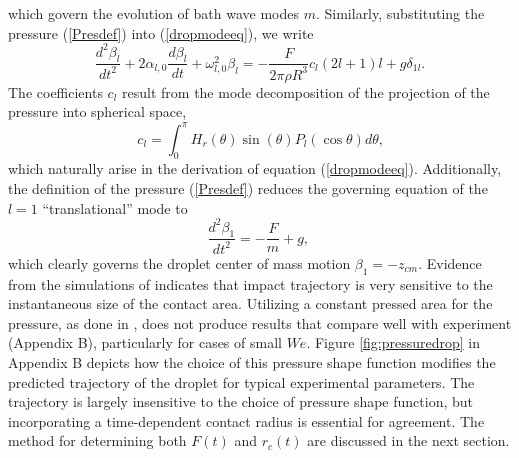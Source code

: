 \documentclass{jfm}
\begin{document}
which govern the evolution of bath wave modes $m$.
Similarly, substituting the pressure (\ref{Presdef}) into (\ref{dropmodeeq}), we write
\begin{equation}
    \frac{d^2 \beta_l}{dt^2} + 2 \alpha_{l,0} \frac{d \beta_l}{dt} + \omega_{l,0}^2 \beta_l = -\frac{F}{2 \pi \rho R^3} c_{l} (2l+1) l + g \delta_{1l} \text{.}
    \label{dropmodeeq2}
\end{equation}
The coefficients $c_{l}$ result from the mode decomposition of the projection of the pressure into spherical space,
\begin{equation}
    c_{l} = \int_0^{\pi} H_r(\theta) \sin(\theta) P_l(\cos{\theta}) d\theta  \text{,}
\end{equation}
which naturally arise in the derivation of equation (\ref{dropmodeeq}). 
Additionally, the definition of the pressure (\ref{Presdef}) reduces the governing equation of the $l=1$ ``translational'' mode to
\begin{equation}
    \frac{d^2 \beta_1}{dt^2} = -\frac{F}{m} + g \text{, } 
\end{equation}
which clearly governs the droplet center of mass motion $\beta_1=-z_{cm}$.
Evidence from the simulations of \cite{galeano2017non} indicates that impact trajectory is very sensitive to the instantaneous size of the contact area. Utilizing a constant pressed area for the pressure, as done in \cite{blanchette2016modeling}, does not produce results that compare well with experiment (Appendix B), particularly for cases of small $We$. Figure \ref{fig:pressuredrop} in Appendix B depicts how the choice of this pressure shape function modifies the predicted trajectory of the droplet for typical experimental parameters. The trajectory is largely insensitive to the choice of pressure shape function, but incorporating a time-dependent contact radius is essential for agreement.  The method for determining both $F(t)$ and $r_c(t)$ are discussed in the next section.

\end{document}
